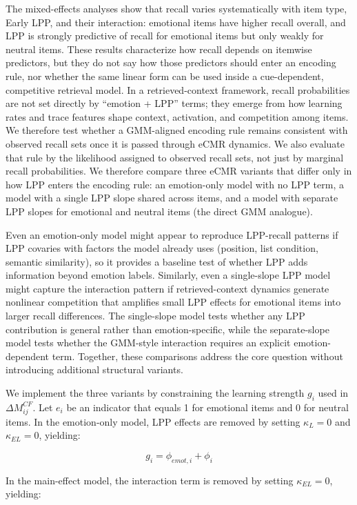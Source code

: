 \documentclass[
  letterpaper,
  DIV=11,
  numbers=noendperiod]{scrartcl}
\begin{document}
The mixed-effects analyses show that recall varies systematically with
item type, Early LPP, and their interaction: emotional items have higher
recall overall, and LPP is strongly predictive of recall for emotional
items but only weakly for neutral items. These results characterize how
recall depends on itemwise predictors, but they do not say how those
predictors should enter an encoding rule, nor whether the same linear
form can be used inside a cue-dependent, competitive retrieval model. In
a retrieved-context framework, recall probabilities are not set directly
by ``emotion + LPP'' terms; they emerge from how learning rates and
trace features shape context, activation, and competition among items.
We therefore test whether a GMM-aligned encoding rule remains consistent
with observed recall sets once it is passed through eCMR dynamics. We
also evaluate that rule by the likelihood assigned to observed recall
sets, not just by marginal recall probabilities. We therefore compare
three eCMR variants that differ only in how LPP enters the encoding
rule: an emotion-only model with no LPP term, a model with a single LPP
slope shared across items, and a model with separate LPP slopes for
emotional and neutral items (the direct GMM analogue).

Even an emotion-only model might appear to reproduce LPP-recall patterns
if LPP covaries with factors the model already uses (position, list
condition, semantic similarity), so it provides a baseline test of
whether LPP adds information beyond emotion labels. Similarly, even a
single-slope LPP model might capture the interaction pattern if
retrieved-context dynamics generate nonlinear competition that amplifies
small LPP effects for emotional items into larger recall differences.
The single-slope model tests whether any LPP contribution is general
rather than emotion-specific, while the separate-slope model tests
whether the GMM-style interaction requires an explicit emotion-dependent
term. Together, these comparisons address the core question without
introducing additional structural variants.

We implement the three variants by constraining the learning strength
\(g_i\) used in \(\Delta M^{CF}_{ij}\). Let \(e_i\) be an indicator that
equals 1 for emotional items and 0 for neutral items. In the
emotion-only model, LPP effects are removed by setting \(\kappa_L = 0\)
and \(\kappa_{EL} = 0\), yielding:

\[
g_i = \phi_{emot,i} + \phi_i
\]

In the main-effect model, the interaction term is removed by setting
\(\kappa_{EL} = 0\), yielding:
\end{document}
